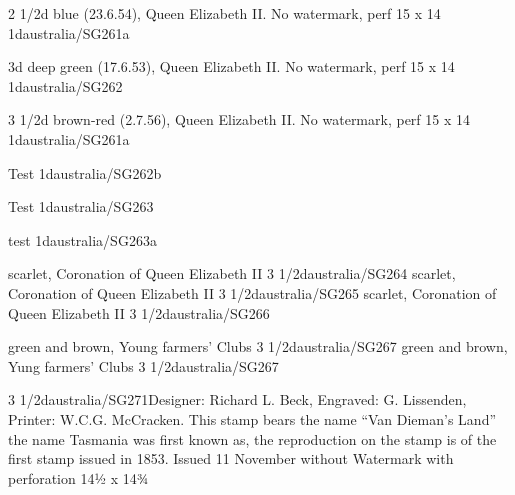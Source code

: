 
%
{2 1/2d blue (23.6.54), Queen Elizabeth II. No watermark, perf 15 x 14}%
{1d}{australia/SG261a}{}{}{}{}

%
{3d deep green (17.6.53), Queen Elizabeth II. No watermark, perf 15 x 14}%
{1d}{australia/SG262}{}{}{}{}

%
{3 1/2d brown-red (2.7.56), Queen Elizabeth II. No watermark, perf 15 x 14}%
{1d}{australia/SG261a}{}{}{}{}

%
{Test}%
{1d}{australia/SG262b}{}{}{}{}

%
{Test}%
{1d}{australia/SG263}{}{}{}{}

%
{test}%
{1d}{australia/SG263a}{}{}{}{}


%
{scarlet, Coronation of Queen Elizabeth II}%
{3 1/2d}{australia/SG264}{}{}{}{}
%
{scarlet, Coronation of Queen Elizabeth II}%
{3 1/2d}{australia/SG265}{}{}{}{}
%
{scarlet, Coronation of Queen Elizabeth II}%
{3 1/2d}{australia/SG266}{}{}{}{}%

%
{green and brown, Young farmers' Clubs}%
{3 1/2d}{australia/SG267}{}{}{}{}%
%
{green and brown, Yung farmers' Clubs}%
{3 1/2d}{australia/SG267}{}{}{}{}%

%

%
{3 1/2d}{australia/SG271}{}{}{}{Designer: Richard L. Beck, Engraved: G. Lissenden, Printer: W.C.G. McCracken. 
This stamp bears the name ``Van Dieman's Land'' the name Tasmania was first known as, the reproduction 
on the stamp is of the first stamp issued in 1853.
Issued 11 November without Watermark with perforation 14½ x 14¾}%


